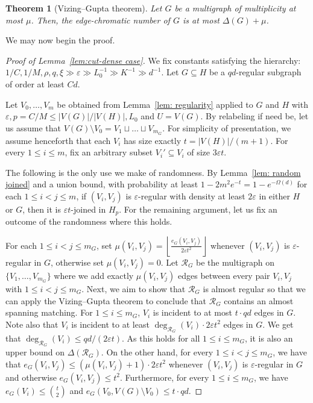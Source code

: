 \documentclass[10pt]{article}
\newtheorem{theorem}{Theorem}[section]
\theoremstyle{definition}
\let\leq\leqslant
\begin{document}
\begin{theorem}[Vizing--Gupta theorem]
    Let $G$ be a multigraph of multiplicity at most $\mu$. Then, the edge-chromatic number of $G$ is at most $\Delta(G)+\mu$.
\end{theorem}
We may now begin the proof.
\begin{proof}[Proof of Lemma~\ref{lem:cut-dense case}]
We fix constants satisfying the hierarchy: $1/C,1/M,\rho,q,\xi \gg \varepsilon \gg L_0^{-1} \gg K^{-1} \gg d^{-1}$. Let $G\subseteq H$ be a $qd$-regular subgraph of order at least $Cd$.

Let $V_0,\ldots,V_m$ be obtained from Lemma~\ref{lem: regularity} applied to $G$ and $H$ with $\varepsilon, p=C/M\leq |V(G)|/|V(H)|, L_0$ and $U=V(G)$. By relabeling if need be, let us assume that $V(G)\setminus V_0=V_1\sqcup\ldots\sqcup V_{m_G}$. For simplicity of presentation, we assume henceforth that each $V_i$ has size exactly $t=|V(H)|/(m+1)$. For every $1\leq i\leq m$, fix an arbitrary subset $V_i'\subseteq V_i$ of size $3\varepsilon t$.

The following is the only use we make of randomness. By Lemma~\ref{lem: random joined} and a union bound, with probability at least $1-2m^2e^{-t}=1-e^{-\Omega(d)}$ for each $1\leq i<j\leq m$, if $(V_i,V_j)$ is $\varepsilon$-regular with density at least $2\varepsilon$ in either $H$ or $G$, then it is $\varepsilon t$-joined in $H_p$. For the remaining argument, let us fix an outcome of the randomness where this holds.

For each $1\leq i<j\leq m_G$, set $\mu(V_i,V_j)=\left\lfloor\frac{e_G(V_i,V_j)}{2\varepsilon t^2}\right\rfloor$ whenever $(V_i,V_j)$ is $\varepsilon$-regular in $G$, otherwise set $\mu(V_i,V_j)=0$. Let $\mathcal R_G$ be the multigraph on $\{V_1,\ldots,V_{m_G}\}$ where we add exactly $\mu(V_i,V_j)$ edges between every pair $V_i,V_j$ with $1\leq i<j\leq m_G$. Next, we aim to show that $\mathcal R_G$ is almost regular so that we can apply the Vizing--Gupta theorem to conclude that $\mathcal R_G$ contains an almost spanning matching. For $1\leq i\leq m_G$, $V_i$ is incident to at most $t\cdot qd$ edges in $G$. Note also that $V_i$ is incident to at least $\deg_{\mathcal{R}_G}(V_i)\cdot 2\varepsilon t^2$ edges in $G$. We get that $\deg_{\mathcal{R}_G}(V_i)\leq qd/(2\varepsilon t)$. As this holds for all $1\leq i\leq m_G$, it is also an upper bound on $\Delta(\mathcal{R}_G)$. On the other hand, for every $1\leq i<j\leq m_G$, we have that $e_G(V_i,V_j)\leq(\mu(V_i,V_j)+1)\cdot 2\varepsilon t^2$ whenever $(V_i,V_j)$ is $\varepsilon$-regular in $G$ and otherwise $e_G(V_i,V_j)\leq t^2$. Furthermore, for every $1\leq i\leq m_G$, we have $e_G(V_i)\leq \binom{t}{2}$ and $e_G(V_0,V(G)\setminus V_0)\leq t\cdot qd$.


\end{proof}
\end{document}
